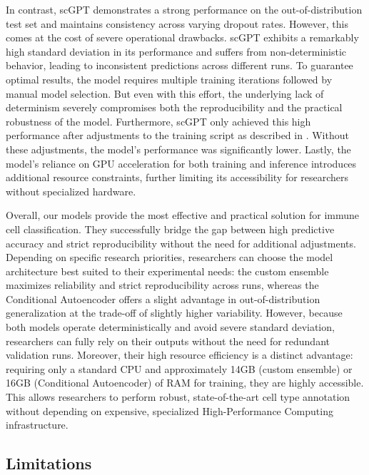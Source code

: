 \documentclass[11pt]{article}
\begin{document}
In contrast, scGPT demonstrates a strong performance on the out-of-distribution test set and maintains consistency across varying dropout rates. However, this comes at the cost of severe operational drawbacks. scGPT exhibits a remarkably high standard deviation in its performance and suffers from non-deterministic behavior, leading to inconsistent predictions across different runs. To guarantee optimal results, the model requires multiple training iterations followed by manual model selection. But even with this effort, the underlying lack of determinism severely compromises both the reproducibility and the practical robustness of the model. 
Furthermore, scGPT only achieved this high performance after adjustments to the training script as described in . Without these adjustments, the model's performance was significantly lower. 
Lastly, the model's reliance on GPU acceleration for both training and inference introduces additional resource constraints, further limiting its accessibility for researchers without specialized hardware.

Overall, our models provide the most effective and practical solution for immune cell classification. They successfully bridge the gap between high predictive accuracy and strict reproducibility without the need for additional adjustments. 
Depending on specific research priorities, researchers can choose the model architecture best suited to their experimental needs: the custom ensemble maximizes reliability and strict reproducibility across runs, whereas the Conditional Autoencoder offers a slight advantage in out-of-distribution generalization at the trade-off of slightly higher variability.
However, because both models operate deterministically and avoid severe standard deviation, researchers can fully rely on their outputs without the need for redundant validation runs. Moreover, their high resource efficiency is a distinct advantage: requiring only a standard CPU and approximately 14GB (custom ensemble) or 16GB (Conditional Autoencoder) of RAM for training, they are highly accessible. This allows researchers to perform robust, state-of-the-art cell type annotation without depending on expensive, specialized High-Performance Computing infrastructure.


\subsection{Limitations}\label{sec:discussion:limitations}
\end{document}
